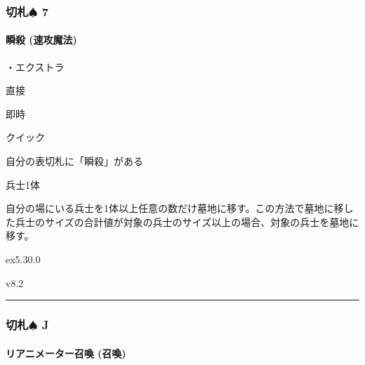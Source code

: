 \documentclass[letterpaper,10pt,dvipdfmx]{sphinxmanual}
\begin{document}
\subsubsection{切札{\normalsize $\spadesuit$} 7}
\label{\detokenize{auto/frameActionlist:id23}}

\paragraph{瞬殺 (速攻魔法)}
\label{\detokenize{auto/frameActionlist:act-instantkill}}\label{\detokenize{auto/frameActionlist:id24}}
\sphinxAtStartPar
{}

\sphinxAtStartPar
・エクストラ

\sphinxAtStartPar
{} 直接

\sphinxAtStartPar
{} 即時

\sphinxAtStartPar
{} クイック

\sphinxAtStartPar
{}

\sphinxAtStartPar
自分の表切札に「瞬殺」がある

\sphinxAtStartPar
{}

\sphinxAtStartPar
兵士1体

\sphinxAtStartPar
{}

\sphinxAtStartPar
自分の場にいる兵士を1体以上任意の数だけ墓地に移す。この方法で墓地に移した兵士のサイズの合計値が対象の兵士のサイズ以上の場合、対象の兵士を墓地に移す。

\sphinxAtStartPar
{}  ex5.30.0

\sphinxAtStartPar
{}  v8.2


\bigskip\hrule\bigskip



\subsubsection{切札{\normalsize $\spadesuit$} J}
\label{\detokenize{auto/frameActionlist:j}}

\paragraph{リアニメーター召喚 (召喚)}
\label{\detokenize{auto/frameActionlist:act-summonreanimator}}\label{\detokenize{auto/frameActionlist:id25}}
\sphinxAtStartPar
{}
\end{document}
